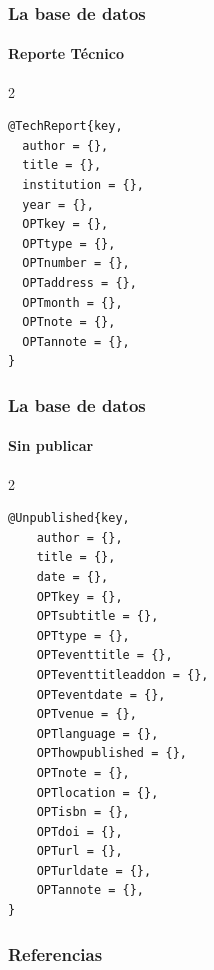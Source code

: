 \documentclass[12pt,aspectratio=169,ignorenonframetext]{ltxbeamer}
\begin{document}
\begin{frame}[fragile]
\frametitle{La base de datos}
\framesubtitle{Reporte Técnico}

\begin{multicols}{2}
    \small
    \begin{verbatim}
@TechReport{key,
  author = {},
  title = {},
  institution = {},
  year = {},
  OPTkey = {},
  OPTtype = {},
  OPTnumber = {},
  OPTaddress = {},
  OPTmonth = {},
  OPTnote = {},
  OPTannote = {},
}
    \end{verbatim}
\end{multicols}
\end{frame}





\begin{frame}[fragile]
\frametitle{La base de datos}
\framesubtitle{Sin publicar}

\begin{multicols}{2}
    \small
    \begin{verbatim}
@Unpublished{key,
    author = {},
    title = {},
    date = {},
    OPTkey = {},
    OPTsubtitle = {},
    OPTtype = {},
    OPTeventtitle = {},
    OPTeventtitleaddon = {},
    OPTeventdate = {},
    OPTvenue = {},
    OPTlanguage = {},
    OPThowpublished = {},
    OPTnote = {},
    OPTlocation = {},
    OPTisbn = {},
    OPTdoi = {},
    OPTurl = {},
    OPTurldate = {},
    OPTannote = {},
}
    \end{verbatim}
\end{multicols}
\end{frame}




\begin{frame}[allowframebreaks]
\frametitle{Referencias}
\nocite{*}
\printbibliography
\end{frame}
\end{document}
